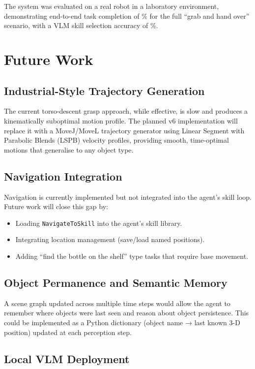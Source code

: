 The system was evaluated on a real \tiago{} robot in a laboratory environment,
demonstrating end-to-end task completion of \% for the full
``grab and hand over'' scenario, with a VLM skill selection accuracy of \%.

\section{Future Work}

\subsection{Industrial-Style Trajectory Generation}

The current torso-descent grasp approach, while effective, is slow and produces
a kinematically suboptimal motion profile.
The planned v6 implementation will replace it with a MoveJ/MoveL trajectory generator
using Linear Segment with Parabolic Blends (LSPB) velocity profiles, providing smooth,
time-optimal motions that generalise to any object type.

\subsection{Navigation Integration}

Navigation is currently implemented but not integrated into the agent's skill loop.
Future work will close this gap by:
\begin{itemize}[noitemsep]
  \item Loading \texttt{NavigateToSkill} into the agent's skill library.
  \item Integrating location management (save/load named positions).
  \item Adding ``find the bottle on the shelf'' type tasks that require base movement.
\end{itemize}

\subsection{Object Permanence and Semantic Memory}

A scene graph updated across multiple time steps would allow the agent to remember
where objects were last seen and reason about object persistence.
This could be implemented as a Python dictionary (object name → last known 3-D
position) updated at each perception step.

\subsection{Local VLM Deployment}

